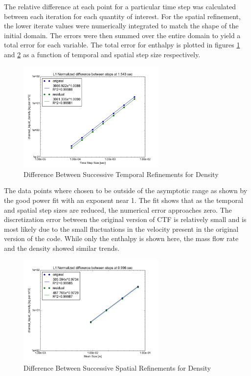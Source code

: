 \documentclass{mc2015}
\begin{document}
The relative difference at each point for a particular time step was calculated
between each iteration for each quantity of interest. For the spatial
refinement, the lower iterate values were numerically integrated to match the
shape of the initial domain. The errors were then summed over the entire domain
to yield a total error for each variable. The total error for enthalpy is
plotted in figures \ref{fig:Temporal:Diff_rho} and \ref{fig:Spatial:Diff_rho} as
a function of temporal and spatial step size respectively. 

\begin{figure}[!h]
	\centering
	\includegraphics[width=0.65\textwidth]{images/Temporal_Study/Difference_rho}
	\caption{Difference Between Successive Temporal Refinements for Density}
	\label{fig:Temporal:Diff_rho}
\end{figure} 

The data points where
chosen to be outside of the asymptotic range as shown by the good power fit
with an exponent near 1. The fit shows that as the temporal and spatial step
sizes are reduced, the numerical error approaches zero. The discretization error
between the original version of CTF is relatively small and is most likely due
to the small fluctuations in the velocity present in the original version of the
code. While only the enthalpy is shown here, the mass flow rate and the density
showed similar trends.

\begin{figure}[!h]
	\centering
	\includegraphics[width=0.65\textwidth]{images/Spatial_Study/Difference_rho}
	\caption{Difference Between Successive Spatial Refinements for Density}
	\label{fig:Spatial:Diff_rho}
\end{figure} 
\end{document}
